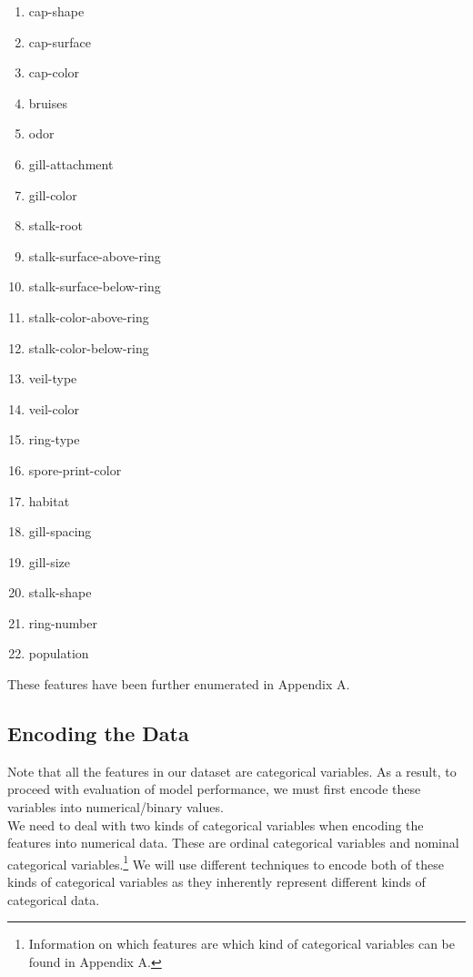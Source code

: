 \documentclass[fleqn]{article}
\begin{document}
    \begin{multicols}{3}
        \begin{enumerate}
            \item cap-shape
            \item cap-surface
            \item cap-color
            \item bruises
            \item odor
            \item gill-attachment
            \item gill-color
            \item stalk-root
            \item stalk-surface-above-ring
            \item stalk-surface-below-ring
            \item stalk-color-above-ring
            \item stalk-color-below-ring
            \item veil-type
            \item veil-color
            \item ring-type
            \item spore-print-color
            \item habitat
            \item gill-spacing
            \item gill-size
            \item stalk-shape
            \item ring-number
            \item population
        \end{enumerate}
    \end{multicols}
    \noindent
    These features have been further enumerated in Appendix A.

    \subsection{Encoding the Data}

    Note that all the features in our dataset are categorical variables. As a result, to
    proceed with evaluation of model performance, we must first encode these variables
    into numerical/binary values.\\

    We need to deal with two kinds of categorical variables when encoding the features
    into numerical data. These are ordinal categorical variables and nominal categorical
    variables.\footnote{Information on which features are which kind of categorical
    variables can be found in Appendix A.} We will use different techniques to encode
    both of these kinds of categorical variables as they inherently represent different
    kinds of categorical data.
\end{document}
